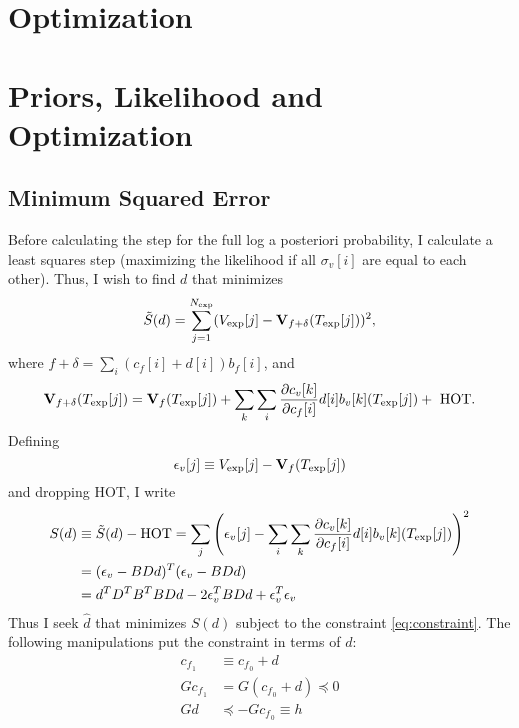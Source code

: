 \documentclass[11pt]{article}
\newcommand{\partiald}[2]{\frac{\partial #1}{\partial #2}}
\newcommand\Vt{\mathbf{V}}
\newcommand\vexp{V_{\rm{exp}}}
\newcommand\texp{T_{\rm{exp}}}
\newcommand\cf{c_f}
\newcommand\cv{c_v}
\newcommand\fbasis{b_f}
\newcommand\vbasis{b_v}
\newcommand\epv{\epsilon_v}
\begin{document}
\section{Optimization}
\label{sec:optimization}

\section{Priors, Likelihood and Optimization}
\label{sec:opt}
\subsection{Minimum Squared Error}
\label{sec:minsq}

Before calculating the step for the full log a posteriori probability,
I calculate a least squares step (maximizing the likelihood if all
$\sigma_v[i]$ are equal to each other).  Thus, I wish to find $d$ that
minimizes
\begin{equation}
  \label{eq:ssq}
  \tilde S(d) = \sum_{j=1}^{N_{\rm exp}} (\vexp[j] - \Vt_{f+\delta}(\texp[j]))^2,
\end{equation}
where $f+\delta = \sum_i (\cf[i] + d[i])\fbasis[i]$, and 
\begin{equation}
  \label{eq:taylor}
  \Vt_{f+\delta}(\texp[j]) = \Vt_f(\texp[j]) +
  \sum_k \sum_i \partiald{\cv[k]}{\cf[i]}d[i]\vbasis[k](\texp[j])
  +\text{ HOT}.
\end{equation}
Defining
\begin{equation}
  \label{eq:epsilon}
  \epv[j] \equiv \vexp[j] - \Vt_f(\texp[j])
\end{equation}
and dropping HOT, I write
\begin{align}
  S(d) &\equiv \tilde S(d) - \text{HOT} = \sum_j \left( \epv[j] -
  \sum_i \sum_k \partiald{\cv[k]}{\cf[i]}d[i]\vbasis[k](\texp[j])
  \right)^2 \nonumber \\
  \label{eq:sd}
  &= (\epv - BDd)^T(\epv - BDd)\\
  &= d^TD^TB^TBDd - 2 \epv^TBDd + \epv^T\epv \nonumber
\end{align}
Thus I seek $\hat d$ that minimizes $S(d)$ subject to the constraint
\eqref{eq:constraint}.  The following manipulations put the constraint
in terms of $d$:
\begin{align*}
  \cf{_{_1}} &\equiv \cf{_{_0}} + d \\
  G \cf{_{_1}} &= G \left( \cf{_{_0}} + d \right) \preceq 0 \\
  G d &\preceq -G \cf{_{_0}} \equiv h
\end{align*}
\end{document}
